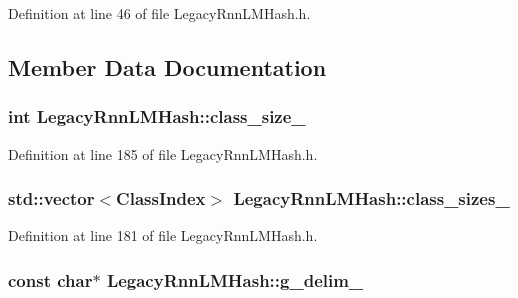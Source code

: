 Definition at line 46 of file Legacy\+Rnn\+L\+M\+Hash.\+h.



\subsection{Member Data Documentation}
\subsubsection[{class\+\_\+size\+\_\+}]{\setlength{\rightskip}{0pt plus 5cm}int Legacy\+Rnn\+L\+M\+Hash\+::class\+\_\+size\+\_\+}\hypertarget{class_legacy_rnn_l_m_hash_a32c4220e66eab108d7d92a91d41e75bb}{}\label{class_legacy_rnn_l_m_hash_a32c4220e66eab108d7d92a91d41e75bb}


Definition at line 185 of file Legacy\+Rnn\+L\+M\+Hash.\+h.

\subsubsection[{class\+\_\+sizes\+\_\+}]{\setlength{\rightskip}{0pt plus 5cm}std\+::vector$<${\bf Class\+Index}$>$ Legacy\+Rnn\+L\+M\+Hash\+::class\+\_\+sizes\+\_\+}\hypertarget{class_legacy_rnn_l_m_hash_aa2976192716a5c8f289f3c9fe19f79ed}{}\label{class_legacy_rnn_l_m_hash_aa2976192716a5c8f289f3c9fe19f79ed}


Definition at line 181 of file Legacy\+Rnn\+L\+M\+Hash.\+h.

\subsubsection[{g\+\_\+delim\+\_\+}]{\setlength{\rightskip}{0pt plus 5cm}const char$\ast$ Legacy\+Rnn\+L\+M\+Hash\+::g\+\_\+delim\+\_\+}\hypertarget{class_legacy_rnn_l_m_hash_a0921a7ba3bae2b5fd9bb8c5a5dae987b}{}\label{class_legacy_rnn_l_m_hash_a0921a7ba3bae2b5fd9bb8c5a5dae987b}


